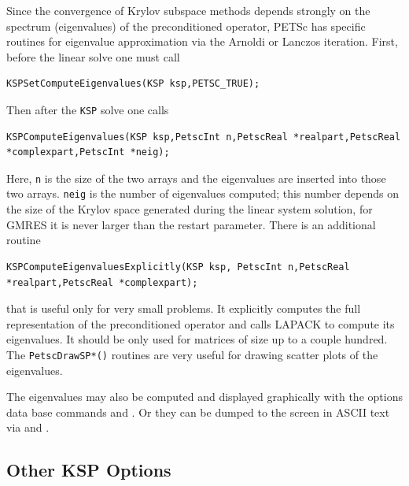 Since the convergence of Krylov subspace methods depends strongly on
the spectrum (eigenvalues) of the preconditioned operator, PETSc has specific
routines for eigenvalue approximation via the Arnoldi or Lanczos iteration.
First, before the linear solve one must call
\begin{lstlisting}
KSPSetComputeEigenvalues(KSP ksp,PETSC_TRUE);
\end{lstlisting}
Then after the \lstinline{KSP} solve one calls
\begin{lstlisting}
KSPComputeEigenvalues(KSP ksp,PetscInt n,PetscReal *realpart,PetscReal *complexpart,PetscInt *neig);
\end{lstlisting}
Here, \lstinline{n} is the size of the two arrays and the eigenvalues are
inserted into those two arrays. \lstinline{neig} is the number of eigenvalues computed;
this number depends on the size of the Krylov space generated during the
linear system solution, for GMRES it is never larger than the restart parameter.
There is an additional routine
\begin{lstlisting}
KSPComputeEigenvaluesExplicitly(KSP ksp, PetscInt n,PetscReal *realpart,PetscReal *complexpart);
\end{lstlisting}
that is useful only for very small problems. It explicitly computes the
full representation of the preconditioned operator and calls LAPACK to
compute its eigenvalues. It should be only used for matrices of size up to
a couple hundred.  The \lstinline{PetscDrawSP*()} routines are very useful for
drawing scatter plots of the eigenvalues. 

The eigenvalues may also be computed and displayed graphically with the options
data base commands  and .   
Or they can be dumped to the screen in ASCII text via
 and .
   

\subsection{Other KSP Options}

